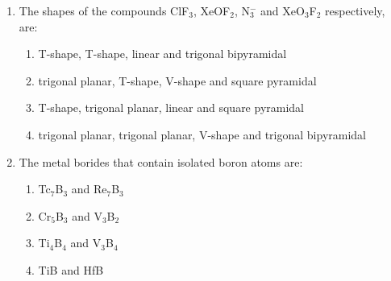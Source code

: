 \documentclass[journal,12pt,onecolumn]{IEEEtran}
\begin{document}
\begin{enumerate}
    \item The shapes of the compounds ClF$_3$, XeOF$_2$, N$_3^-$ and XeO$_3$F$_2$ respectively, are:
    \begin{multicols}{2}
    \begin{enumerate}
        \item T-shape, T-shape, linear and trigonal bipyramidal
        \item trigonal planar, T-shape, V-shape and square pyramidal
        \item T-shape, trigonal planar, linear and square pyramidal
        \item trigonal planar, trigonal planar, V-shape and trigonal bipyramidal
    \end{enumerate}
    \end{multicols}
    \hfill{}

    \item The metal borides that contain isolated boron atoms are:
    \begin{multicols}{2}
    \begin{enumerate}
        \item Tc$_7$B$_3$ and Re$_7$B$_3$
        \item Cr$_5$B$_3$ and V$_3$B$_2$
        \item Ti$_4$B$_4$ and V$_3$B$_4$
        \item TiB and HfB
    \end{enumerate}
    \end{multicols}
    \hfill{}


\end{enumerate}
\end{document}
